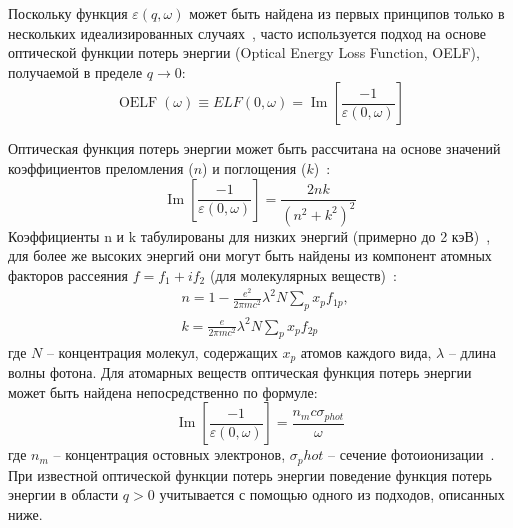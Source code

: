 Поскольку функция $\varepsilon(q, \omega)$ может быть найдена из первых принципов только в нескольких идеализированных случаях~\cite{Ritchie_ELF}, часто используется подход на основе оптической функции потерь энергии (Optical Energy Loss Function, OELF), получаемой в пределе $q \rightarrow 0$:
\begin{equation}
	\operatorname{OELF}(\omega) \equiv E L F(0, \omega)=\operatorname{Im}\left[\frac{-1}{\varepsilon(0, \omega)}\right]
\end{equation}

Оптическая функция потерь энергии может быть рассчитана на основе значений коэффициентов преломления ($n$) и поглощения ($k$)~\cite{Dapor_2015_oscillators}:
\begin{equation}
	\operatorname{Im}\left[\frac{-1}{\varepsilon(0, \omega)}\right]=\frac{2 n k}{\left(n^2+k^2\right)^2}
\end{equation}
Коэффициенты n и k табулированы для низких энергий (примерно до 2 кэВ)~\cite{Palik}, для более же высоких энергий они могут быть найдены из компонент атомных факторов рассеяния $f = f_1 + i f_2$ (для молекулярных веществ)~\cite{Henke_photoabs}:
\begin{equation}
	\begin{aligned}
		&n=1-\frac{e^2}{2 \pi m c^2} \lambda^2 N \sum_p x_p f_{1 p}, \\
		&k=\frac{e}{2 \pi m c^2} \lambda^2 N \sum_p x_p f_{2 p}
	\end{aligned}
\end{equation}
где $N$ -- концентрация молекул, содержащих $x_p$ атомов каждого вида, $\lambda$ -- длина волны фотона. Для атомарных веществ оптическая функция потерь энергии может быть найдена непосредственно по формуле:
\begin{equation}
	\operatorname{Im}\left[\frac{-1}{\varepsilon(0, \omega)}\right]=\frac{n_m c \sigma_{p h o t}}{\omega}
\end{equation}
где $n_m$ -- концентрация остовных электронов, $\sigma_phot$ – сечение фотоионизации~\cite{Biggs_cs}. При известной оптической функции потерь энергии поведение функция потерь энергии в области $q > 0$ учитывается с помощью одного из подходов, описанных ниже.


